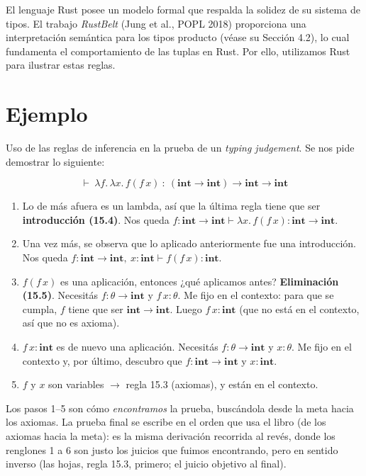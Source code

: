 \documentclass[runningheads]{llncs}
\newcommand{\Int}{\mathbf{int}}
\begin{document}
El lenguaje Rust posee un modelo formal que respalda la solidez de su sistema de tipos. El trabajo \textit{RustBelt} (Jung et al., POPL 2018) proporciona una interpretación semántica para los tipos producto (véase su Sección 4.2), lo cual fundamenta el comportamiento de las tuplas en Rust. Por ello, utilizamos Rust para ilustrar estas reglas\cite{RustBelt}.

\section*{Ejemplo}

Uso de las reglas de inferencia en la prueba de un \emph{typing judgement}.
Se nos pide demostrar lo siguiente:

\[
\vdash\ \lambda f.\,\lambda x.\,f(f\,x)\ \colon\ (\Int\to\Int)\to\Int\to\Int
\]

\begin{enumerate}
  \item Lo de más afuera es un lambda, así que la última regla tiene que ser
        \textbf{introducción (15.4)}. Nos queda
        $f\colon\Int\to\Int \vdash \lambda x.\,f(f\,x)\colon\Int\to\Int$.

  \item Una vez más, se observa que lo aplicado anteriormente fue una introducción.
        Nos queda $f\colon\Int\to\Int,\ x\colon\Int \vdash f(f\,x)\colon\Int$.

  \item $f(f\,x)$ es una aplicación, entonces ¿qué aplicamos antes?
        \textbf{Eliminación (15.5)}. Necesitás $f\colon\theta\to\Int$ y
        $f\,x\colon\theta$. Me fijo en el contexto: para que se cumpla, $f$ tiene
        que ser $\Int\to\Int$. Luego $f\,x\colon\Int$ (que no está en el contexto,
        así que no es axioma).

  \item $f\,x\colon\Int$ es de nuevo una aplicación. Necesitás $f\colon\theta\to\Int$
        y $x\colon\theta$. Me fijo en el contexto y, por último, descubro que
        $f\colon\Int\to\Int$ y $x\colon\Int$.

  \item $f$ y $x$ son variables $\to$ regla 15.3 (axiomas), y están en el contexto.
\end{enumerate}

Los pasos 1--5 son cómo \emph{encontramos} la prueba, buscándola desde la meta hacia
los axiomas. La prueba final se escribe en el orden que usa el libro (de los axiomas
hacia la meta): es la misma derivación recorrida al revés, donde los renglones 1 a 6
son justo los juicios que fuimos encontrando, pero en sentido inverso (las hojas,
regla 15.3, primero; el juicio objetivo al final).
\end{document}
